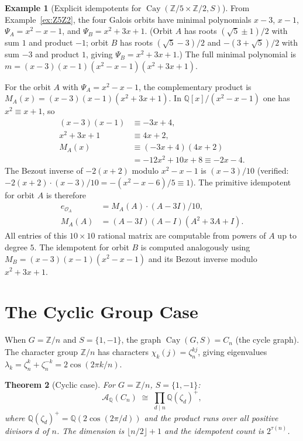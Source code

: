\documentclass[12pt]{amsart}
\numberwithin{equation}{section}
\theoremstyle{plain}
\newtheorem{theorem}{Theorem}[section]
\theoremstyle{definition}
\newtheorem{example}[theorem]{Example}
\DeclareMathOperator{\Cay}{Cay}
\newcommand{\Z}{\mathbb{Z}}
\newcommand{\Q}{\mathbb{Q}}
\newcommand{\calA}{\mathcal{A}}
\newcommand{\calO}{\mathcal{O}}
\begin{document}
\begin{example}[Explicit idempotents for $\Cay(\Z/5 \times \Z/2, S)$]
\label{ex:Z5Z2-idem}
From Example~\ref{ex:Z5Z2}, the four Galois orbits have minimal polynomials
$x-3$, $x-1$, $\Psi_A = x^2-x-1$, and $\Psi_B = x^2+3x+1$.
(Orbit $A$ has roots $(\sqrt{5}\pm 1)/2$ with sum $1$ and product $-1$;
orbit $B$ has roots $(\sqrt{5}-3)/2$ and $-(3+\sqrt{5})/2$ with sum $-3$
and product $1$, giving $\Psi_B = x^2+3x+1$.)
The full minimal polynomial is
$m = (x-3)(x-1)(x^2-x-1)(x^2+3x+1)$.

For the orbit $A$ with $\Psi_A = x^2-x-1$, the complementary product is
$M_A(x) = (x-3)(x-1)(x^2+3x+1)$.  In $\Q[x]/(x^2-x-1)$ one has $x^2
\equiv x+1$, so
\begin{align*}
  (x-3)(x-1) &\equiv -3x+4, \\
  x^2+3x+1   &\equiv 4x+2,  \\
  M_A(x) &\equiv (-3x+4)(4x+2) \\
         &= -12x^2+10x+8 \equiv -2x-4.
\end{align*}
The Bezout inverse of $-2(x+2)$ modulo $x^2-x-1$ is $(x-3)/10$
(verified: $-2(x+2)\cdot(x-3)/10 = -(x^2-x-6)/5 \equiv 1$).
The primitive idempotent for orbit $A$ is therefore
\begin{align*}
  e_{\calO_A} &= M_A(A) \cdot (A-3I)/10, \\
  M_A(A) &= (A-3I)(A-I)(A^2+3A+I).
\end{align*}
All entries of this $10 \times 10$ rational matrix are computable from
powers of $A$ up to degree $5$.  The idempotent for orbit $B$ is computed
analogously using $M_B = (x-3)(x-1)(x^2-x-1)$ and its Bezout inverse
modulo $x^2+3x+1$.
\end{example}

\section{The Cyclic Group Case}
\label{sec:cyclic}

When $G = \Z/n$ and $S = \{1, -1\}$, the graph $\Cay(G,S) = C_n$ (the
cycle graph).  The character group $\widehat{\Z/n}$ has characters
$\chi_k(j) = \zeta_n^{kj}$, giving eigenvalues $\lambda_k =
\zeta_n^k + \zeta_n^{-k} = 2\cos(2\pi k/n)$.

\begin{theorem}[Cyclic case]
\label{thm:cyclic}
For $G = \Z/n$, $S = \{1, -1\}$:
\[
  \calA_\Q(C_n) \;\cong\; \prod_{d \mid n} \Q(\zeta_d)^+,
\]
where $\Q(\zeta_d)^+ = \Q(2\cos(2\pi/d))$ and the product runs over all
positive divisors $d$ of $n$.  The dimension is $\lfloor n/2 \rfloor + 1$
and the idempotent count is $2^{\tau(n)}$.
\end{theorem}
\end{document}
